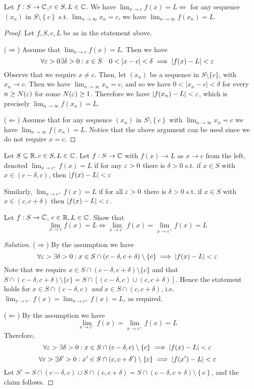 \begin{proposition}
  Let $f:S\to\mathbb C$,$c\in S,L\in\mathbb C$. We have
  $\lim_{x\to c}f(x)=L \iff$ for any sequence $(x_n)$ in $S\setminus \left\{ c
  \right\}$ s.t. $\lim_{n\to \infty} x_n=c$, we have $\lim_{n\to \infty} f(x_n)=L$.
  \label{<+label+>}
\end{proposition}
\begin{proof}
  Let $f,S,c,L$ be as in the statement above.

  ($\Rightarrow$) Assume that $\lim_{x\to c}f(x)=L$. Then we have 
  \[\forall\eps>0\exists\delta>0 : x\in S \quad 0<|x-c|<\delta \implies|f(x)-L|<\eps\]
  Observe that we require $x\neq c$. Then, let $(x_n)$ be a sequence in $S\setminus\{c\}$,
  with $x_n\to c$. Then we have $\lim_{n\to \infty} x_n=c$, and so we have
  $0<|x_n-c|<\delta$ for every $n\geq N(\varepsilon)$ for some $N(\varepsilon)\geq 1$. Therefore we have
  $|f(x_n)-L|<\varepsilon$, which is precisely $\lim_{n\to \infty} f(x_n)=L$.

  ($\Leftarrow$) Assume that for any sequence $(x_n)$ in $S\setminus \left\{ c
  \right\}$ with $\lim_{n\to \infty}x_n=c$ we have $\lim_{n\to \infty}f(x_n)=L$. Notice
  that the above argument can be used since we do not require $x=c$.
\end{proof}


\begin{example}
  Let $S\subseteq\mathbb R, c\in S, L\in\mathbb C$. Let $f:S\to\mathbb C$ with $f(x)\to L$ as $x\to c$ from
  the left, denoted $\lim_{x\to c^-}f(x)=L$ if for any $\varepsilon>0$ there is $\delta>0$ s.t.
  if $x\in S$ with $x\in (c-\delta, c)$, then $|f(x)-L| < \varepsilon$

  Similarly, $\lim_{x\to c^+}f(x)=L$ if for all $\varepsilon>0$ there is $\delta>0$ s.t. if $x\in
  S$ with $x\in (c,c+\delta)$ then $|f(x)-L|<\varepsilon$. 

  Let $f:S\to\mathbb C$, $c\in\mathbb R,L\in\mathbb C$. Show that 
  \[\lim_{x\to c} f(x)=L \iff \lim_{x\to c^-}f(x)=\lim_{x\to c^+}f(x)=L\]
  \label{ex:limitsSides}
\end{example}
\begin{proof}[Solution]
  ($\Rightarrow$) By the assumption we have
  \[\forall\varepsilon>\exists\delta>0 : x\in S\cap (c-\delta, c+\delta)\setminus\{c\} \implies |f(x)-L|<\varepsilon\]
  Note that we require $x\in S\cap (c-\delta, c+\delta)\setminus\{c\}$ and that $S\cap
  (c-\delta, c+\delta)\setminus\{c\} = S\cap[(c-\delta,c)\cup(c,c+\delta)]$. Hence the
  statement holds for $x\in S\cap (c-\delta, c)$ \emph{and} $x\in S\cap (c,c+\delta )$,
  i.e. $\lim_{x\to c^-} f(x) = \lim_{x\to c^+} f(x) = L$, as required.

  ($\Leftarrow$) By the assumption we have 
  \[\lim_{x\to c^-} f(x) = \lim_{x\to c^+} f(x) = L\]
  Therefore, 
  \[\forall\varepsilon>\exists\delta>0 : x\in S\cap (c-\delta, c)\setminus\{c\} \implies |f(x)-L|<\varepsilon\]
  \[\forall\varepsilon>\exists\delta'>0 : x'\in S\cap (c, c+\delta')\setminus\{c\} \implies |f(x')-L|<\varepsilon\]
  Let $S'=S\cap(c-\delta,c) \cup S\cap (c,c+\delta) = S\cap (c-\delta, c+\delta)\setminus
  \left\{ c \right\}$, and the claim follows.
\end{proof}

